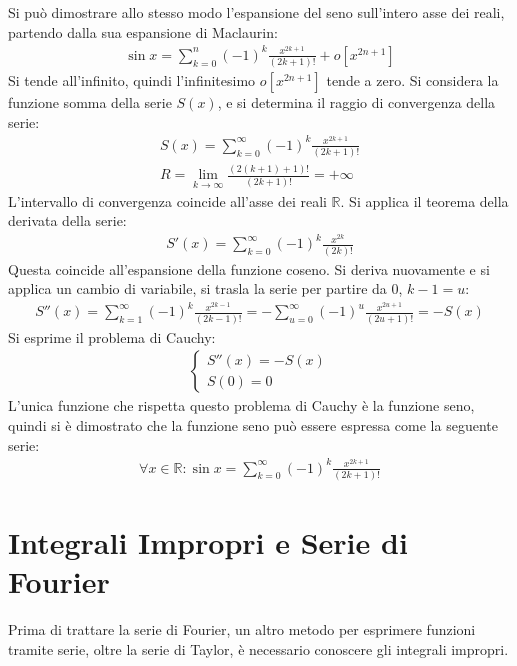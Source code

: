 \documentclass{article}
\numberwithin{equation}{subsection}
\begin{document}
Si può dimostrare allo stesso modo l'espansione del seno sull'intero asse dei reali, partendo dalla sua espansione di Maclaurin:
\begin{gather*}
    \sin x =\sum_{k=0}^n(-1)^k\frac{x^{2k+1}}{(2k+1)!}+o[x^{2n+1}]
\end{gather*}
Si tende all'infinito, quindi l'infinitesimo $o[x^{2n+1}]$ tende a zero. Si considera la funzione somma della serie $S(x)$, e si determina il raggio di convergenza della serie:
\begin{gather*}
    S(x)=\sum_{k=0}^\infty (-1)^k\frac{x^{2k+1}}{(2k+1)!}\\
    R=\lim_{k\to\infty}\frac{(2(k+1)+1)!}{(2k+1)!}=+\infty
\end{gather*}
L'intervallo di convergenza coincide all'asse dei reali $\mathbb{R}$. Si applica il teorema della derivata della serie:
\begin{gather*}
    S'(x)=\sum_{k=0}^\infty(-1)^{k}\frac{x^{2k}}{(2k)!}
\end{gather*}
Questa coincide all'espansione della funzione coseno. Si deriva nuovamente e si applica un cambio di variabile, si trasla la serie per partire da 0, $k-1=u$:
\begin{gather*}
    S''(x)=\sum_{k=1}^\infty(-1)^k\frac{x^{2k-1}}{(2k-1)!}=-\sum_{u=0}^\infty(-1)^{u}\frac{x^{2u+1}}{(2u+1)!}=-S(x)
\end{gather*}
Si esprime il problema di Cauchy:
\begin{gather*}
    \begin{cases}
        S''(x)=-S(x)\\
        S(0)=0
    \end{cases}
\end{gather*}
L'unica funzione che rispetta questo problema di Cauchy è la funzione seno, quindi si è dimostrato che la funzione seno può essere espressa come la seguente serie:
\begin{gather}
    \forall x\in\mathbb{R}:\sin x=\displaystyle\sum_{k=0}^\infty(-1)^k\frac{x^{2k+1}}{(2k+1)!}
\end{gather}

\clearpage

\section{Integrali Impropri e Serie di Fourier}

Prima di trattare la serie di Fourier, un altro metodo per esprimere funzioni tramite serie, oltre la serie di Taylor, è necessario conoscere gli integrali impropri. 
\end{document}
